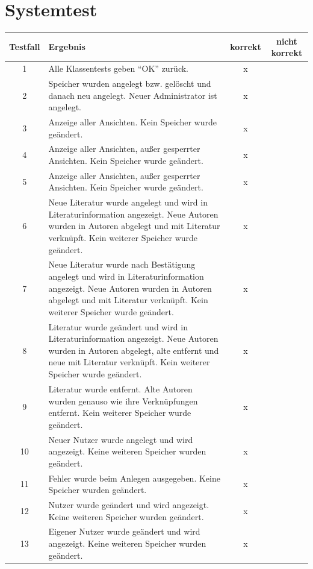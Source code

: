 \section{Systemtest}
\begin{longtable}{|c|p{8cm}|c|c|}
\hline
	\textbf{Testfall} & 
	\textbf{Ergebnis} &
	\textbf{korrekt} &
	\textbf{nicht korrekt}\\
\hline\hline
\endhead

 1 & Alle Klassentests geben ``OK'' zurück. & x &  \\\hline
 2 & Speicher wurden angelegt bzw. gelöscht und danach neu angelegt. Neuer Administrator ist angelegt. & x &  \\\hline
 3 & Anzeige aller Ansichten. Kein Speicher wurde geändert. & x &  \\\hline
 4 & Anzeige aller Ansichten, außer gesperrter Ansichten. Kein Speicher wurde geändert. & x &  \\\hline
 5 & Anzeige aller Ansichten, außer gesperrter Ansichten. Kein Speicher wurde geändert. & x &  \\\hline
 6 & Neue Literatur wurde angelegt und wird in Literaturinformation angezeigt. Neue Autoren wurden in Autoren abgelegt und mit Literatur verknüpft. Kein weiterer Speicher wurde geändert. & x &  \\\hline
 7 & Neue Literatur wurde nach Bestätigung angelegt und wird in Literaturinformation angezeigt. Neue Autoren wurden in Autoren abgelegt und mit Literatur verknüpft. Kein weiterer Speicher wurde geändert. & x &  \\\hline
 8 & Literatur wurde geändert und wird in Literaturinformation angezeigt. Neue Autoren wurden in Autoren abgelegt, alte entfernt und neue mit Literatur verknüpft. Kein weiterer Speicher wurde geändert. & x &  \\\hline
 9 & Literatur wurde entfernt. Alte Autoren wurden genauso wie ihre Verknüpfungen entfernt. Kein weiterer Speicher wurde geändert. & x &  \\\hline
10 & Neuer Nutzer wurde angelegt und wird angezeigt. Keine weiteren Speicher wurden geändert. & x &  \\\hline
11 & Fehler wurde beim Anlegen ausgegeben. Keine Speicher wurden geändert. & x &  \\\hline
12 & Nutzer wurde geändert und wird angezeigt. Keine weiteren Speicher wurden geändert. & x &  \\\hline
13 & Eigener Nutzer wurde geändert und wird angezeigt. Keine weiteren Speicher wurden geändert. & x &  \\\hline

\end{longtable}
